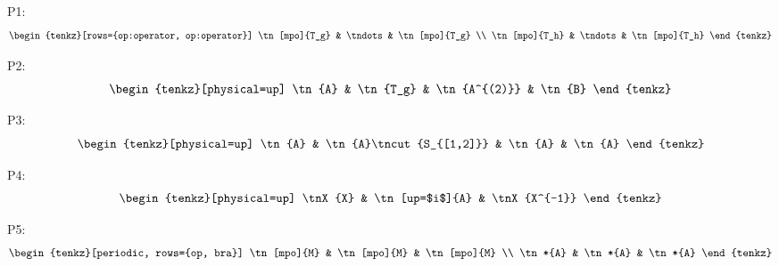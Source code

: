 \documentclass[varwidth=16cm, border=6pt]{standalone}
\begin{document}
P1:
\[
  \begin{tenkz}[rows={op:operator, op:operator}]
    \tn[mpo]{T_g} & \tndots & \tn[mpo]{T_g} \\
    \tn[mpo]{T_h} & \tndots & \tn[mpo]{T_h}
  \end{tenkz}
\]

P2:
\[
  \begin{tenkz}[physical=up]
    \tn{A} & \tn{T_g} & \tn{A^{(2)}} & \tn{B}
  \end{tenkz}
\]

P3:
\[
  \begin{tenkz}[physical=up]
    \tn{A} & \tn{A}\tncut{S_{[1,2]}} & \tn{A} & \tn{A}
  \end{tenkz}
\]

P4:
\[
  \begin{tenkz}[physical=up]
    \tnX{X} & \tn[up=$i$]{A} & \tnX{X^{-1}}
  \end{tenkz}
\]

P5:
\[
  \begin{tenkz}[periodic, rows={op, bra}]
    \tn[mpo]{M} & \tn[mpo]{M} & \tn[mpo]{M} \\
    \tn*{A} & \tn*{A} & \tn*{A}
  \end{tenkz}
\]
\end{document}
